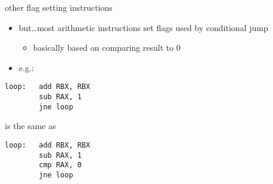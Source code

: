 \begin{frame}[fragile,label=otherFlags]{other flag setting instructions}
\begin{itemize}
\item but\ldots most arithmetic instructions set flags used by conditional jump
    \begin{itemize}
    \item basically based on comparing result to 0
    \end{itemize}
\item e.g.:
\end{itemize}
\begin{lstlisting}
loop:   add RBX, RBX
        sub RAX, 1
        jne loop
\end{lstlisting}
is the same as
\begin{lstlisting}
loop:   add RBX, RBX
        sub RAX, 1
        cmp RAX, 0
        jne loop
\end{lstlisting}
\end{frame}
